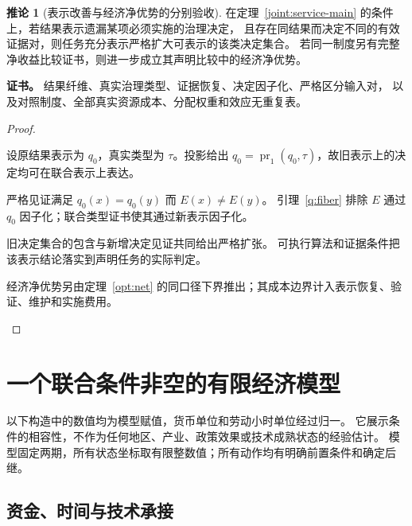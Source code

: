 \documentclass[UTF8,12pt,a4paper,openany,fontset=none,zihao=false]{ctexrep}
\theoremstyle{definition}
\newtheorem{corollary}{推论}[chapter]
\newenvironment{certificate}{\par\noindent\textbf{证书。}\ignorespaces}{\par}
\newcommand{\1}{\mathbf 1}
\begin{document}
\begin{corollary}[表示改善与经济净优势的分别验收]
\label{joint:service-comparison}
在定理~\ref{joint:service-main} 的条件上，若结果表示遗漏某项必须实施的治理决定，
且存在同结果而决定不同的有效证据对，则任务充分表示严格扩大可表示的该类决定集合。
若同一制度另有完整净收益比较证书，则进一步成立其声明比较中的经济净优势。
\end{corollary}
\begin{certificate}
结果纤维、真实治理类型、证据恢复、决定因子化、严格区分输入对，
以及对照制度、全部真实资源成本、分配权重和效应无重复表。
\end{certificate}
\begin{proof}
\begin{semanticsteps}
\item 设原结果表示为 \(q_0\)，真实类型为 \(\tau\)。投影给出
\(q_0=\operatorname{pr}_1(q_0,\tau)\)，故旧表示上的决定均可在联合表示上表达。
\item 严格见证满足 \(q_0(x)=q_0(y)\) 而 \(E(x)\ne E(y)\)。
引理~\ref{q:fiber} 排除 \(E\) 通过 \(q_0\) 因子化；联合类型证书使其通过新表示因子化。
\item 旧决定集合的包含与新增决定见证共同给出严格扩张。
可执行算法和证据条件把该表示结论落实到声明任务的实际判定。
\item 经济净优势另由定理~\ref{opt:net} 的同口径下界推出；其成本边界计入表示恢复、验证、维护和实施费用。
\end{semanticsteps}
\end{proof}


\section{一个联合条件非空的有限经济模型}

以下构造中的数值均为模型赋值，货币单位和劳动小时单位经过归一。
它展示条件的相容性，不作为任何地区、产业、政策效果或技术成熟状态的经验估计。
模型固定两期，所有状态坐标取有限整数值；所有动作均有明确前置条件和确定后继。

\subsection{资金、时间与技术承接}
\end{document}
